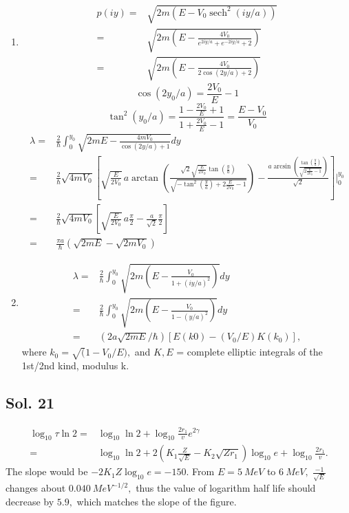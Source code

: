 \begin{enumerate}
Therefore
\begin{align*}
     Ae^{-ika}+Be^{ika}=Ce^{ika},\; Ae^{-ika}-Be^{ika} = Ce^{ika}
\end{align*}
\begin{align*}
    A = \frac{1}{2}Ce^{ika},\;
    B = 0.
\end{align*}
\item 
\begin{align*}
    p(iy)=&\sqrt{2m(E-V_0\operatorname{sech}^2(iy/a))}\\
    =&\sqrt{2m(E-\frac{4V_0}{e^{2iy/a}+e^{-2iy/a}+2})}\\
    =&\sqrt{2m(E-\frac{4V_0}{2\cos(2y/a)+2})}
\end{align*}
$$
\cos(2y_0/a)=\frac{2V_0}{E}-1
$$
$$
\tan^2(y_0/a)=\frac{1-\frac{2V_0}{E}+1}{1+\frac{2V_0}{E}-1}
=\frac{E-V_0}{V_0}
$$
\begin{align*}
    \lambda=&\frac{2}{\hbar}
    \int_0^{y_0}
    \sqrt{2mE-\frac{4mV_0}{\cos(2y/a)+1}}dy\\
    =&
    \frac{2}{\hbar}\sqrt{4mV_0}
    \left[
    \sqrt{\frac{E}{2V_0}} \, a \arctan\left(\frac{\sqrt{2} \sqrt{\frac{E}{2V_0}} \tan\left(\frac{y}{a}\right)}{\sqrt{-\tan^{2}\left(\frac{y}{a}\right) + 2\frac{E}{2V_0} - 1}}\right) - \frac{a \arcsin\left(\frac{\tan\left(\frac{y}{a}\right)}{\sqrt{2\frac{E}{2V_0} - 1}}\right)}{\sqrt{2}}
    \right]\bigg|^{y_0}_0\\
    =&
    \frac{2}{\hbar}\sqrt{4mV_0}
    \left[
    \sqrt{\frac{E}{2V_0}} \, a \frac{\pi}{2} - \frac{a}{\sqrt{2}}\frac{\pi}{2}
    \right]\\
    =&\frac{\pi a}{\hbar}(\sqrt{2mE}-\sqrt{2mV_0})
\end{align*}
\item 
\begin{align*}
    \lambda =& \frac{2}{\hbar}
    \int_0^{y_0}
    \sqrt{2m(E - \frac{V_0}{1+(iy/a)^2})}dy\\
    =&
     \frac{2}{\hbar}
    \int_0^{y_0}
    \sqrt{2m(E - \frac{V_0}{1-(y/a)^2})}dy\\
    =&
    (2a\sqrt{2mE}/\hbar) [ E(k0) - (V_0/E)K(k_0) ],
\end{align*}
where $k_0 = \sqrt(1-V_0/E),$ and 
$K, E$ = complete elliptic integrals of the 1st/2nd kind, modulus k.


\end{enumerate}

\subsection*{Sol. 21}
\begin{align*}
    \log_{10}\tau\ln2 
    = & \log_{10} \ln 2 +  \log_{10} \frac{2r_1}{v}e^{2\gamma}\\
    =&\log_{10} \ln 2 +  2(K_1\frac{Z}{\sqrt{E}}-K_2\sqrt{Z r_1})\log_{10}e+\log_{10} \frac{2r_1}{v}.
\end{align*}
The slope would be $-2K_1 Z\log_{10}e= -150.$ From $E = \qty{5}{MeV}$ to $\qty{6}{MeV},$ $\frac{-1}{\sqrt{E}}$ changes about $\qty{0.040}{MeV^{-1/2}},$ thus the value of logarithm half life should decrease by $5.9,$ which matches the slope of the figure.